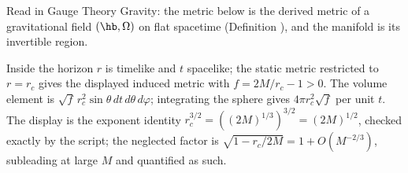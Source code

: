 Read in Gauge Theory Gravity: the metric below is the derived metric of a gravitational field $(\hb, \Omega)$ on flat spacetime (Definition ), and the manifold is its invertible region.

Inside the horizon $r$ is timelike and $t$ spacelike; the static metric restricted to $r = r_c$ gives the displayed induced metric with $f = 2M/r_c - 1 > 0$. The volume element is $\sqrt{f}\,r_c^2\sin\theta\,dt\,d\theta\,d\varphi$; integrating the sphere gives $4\pi r_c^2\sqrt f$ per unit $t$. The display is the exponent identity $r_c^{3/2} = ((2M)^{1/3})^{3/2} = (2M)^{1/2}$, checked exactly by the script; the neglected factor is $\sqrt{1 - r_c/2M} = 1 + O(M^{-2/3})$, subleading at large $M$ and quantified as such.
